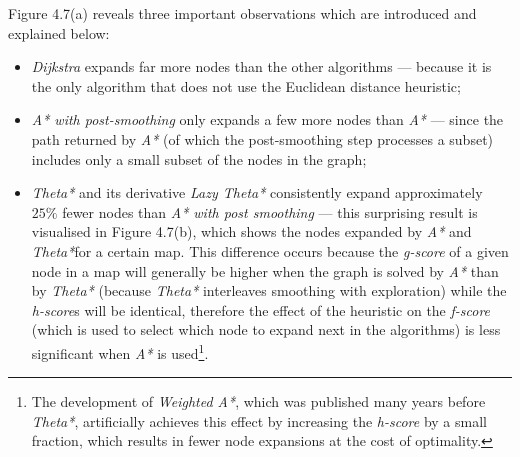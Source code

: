 \documentclass[12pt,notitlepage]{report}
\begin{document}
\noindent
Figure 4.7(a) reveals three important observations which are introduced and explained below:
\begin{itemize}
\item {\em Dijkstra} expands far more nodes than the other algorithms --- because it is the only algorithm that does not use the Euclidean distance heuristic;
\item {\em A* with post-smoothing} only expands a few more nodes than {\em A*} --- since the path returned by {\em A*} (of which the post-smoothing step processes a subset) includes only a small subset of the nodes in the graph;
\item {\em Theta*} and its derivative {\em Lazy Theta*} consistently expand approximately $25\%$ fewer nodes than {\em A* with post smoothing} --- this surprising result is visualised in Figure 4.7(b), which shows the nodes expanded by {\em A*} and {\em Theta*}for a certain map. This difference occurs because the {\em g-score} of a given node in a map will generally be higher when the graph is solved by {\em A*} than by {\em Theta*} (because {\em Theta*} interleaves smoothing with exploration) while the {\em h-score}s will be identical, therefore the effect of the heuristic on the {\em f-score} (which is used to select which node to expand next in the algorithms) is less significant when {\em A*} is used\footnote{The development of {\em Weighted A*}\cite{Pearl84}, which was published many years before {\em Theta*}, artificially achieves this effect by increasing the {\em h-score} by a small fraction, which results in fewer node expansions at the cost of optimality.}.
\end{itemize}
\end{document}
